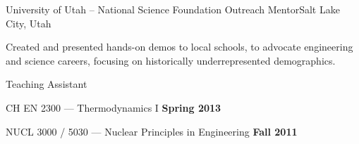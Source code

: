 \begin{rSubsection}{University of Utah}{ -- }{National Science Foundation Outreach Mentor}{Salt Lake City, Utah}
\item Created and presented hands-on demos to local schools, to advocate engineering and science careers, focusing on historically underrepresented demographics.
\end{rSubsection}\vspace{-1.5\baselineskip}
\begin{rSubsection}{}{}{Teaching Assistant}{}
\item CH EN 2300 ---  Thermodynamics I \hfill {\bf Spring 2013}
\item NUCL 3000 / 5030 ---  Nuclear Principles in Engineering \hfill {\bf Fall 2011}
% 





\end{rSubsection}
